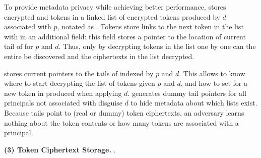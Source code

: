 To provide metadata privacy while achieving better performance, \sys stores encrypted  and
 tokens in a linked list of encrypted tokens produced by $d$ associated with $p$, notated
as . 
Tokens store links to the next token in the list with in an additional  field: this
field stores a pointer to the location of current tail of  for $p$ and $d$.
Thus, only by decrypting tokens in the list one by one can the entire  be discovered and
the ciphertexts in the list decrypted.

\sys stores current pointers to the tails of  indexed by $p$ and $d$. This allows \sys to
know where to start decrypting the list of tokens given $p$ and $d$, and how to set
 for a new token in  produced when applying $d$. \sys generates dummy
tail pointers for all principals not associated with disguise $d$ to hide metadata about which lists
exist.
Because  tails point to (real or dummy) token ciphertexts, an adversary learns nothing
about the token contents or how many tokens are associated with a principal.

\vspace{6pt}\noindent\textbf{(3) \tpriv{} Token Ciphertext Storage.}
.
\fi
